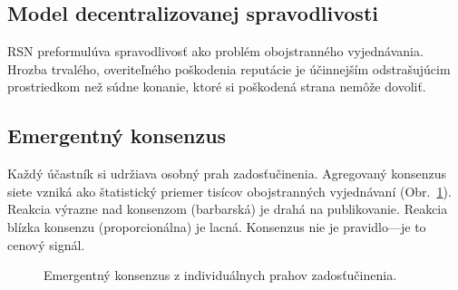 \documentclass[11pt,a4paper,twocolumn]{article}
\begin{document}
\subsection{Model decentralizovanej spravodlivosti}

RSN preformulúva spravodlivosť ako problém obojstranného vyjednávania. Hrozba trvalého, overiteľného poškodenia reputácie je účinnejším odstrašujúcim prostriedkom než súdne konanie, ktoré si poškodená strana nemôže dovoliť.

\subsection{Emergentný konsenzus}

Každý účastník si udržiava osobný prah zadosťučinenia. Agregovaný konsenzus siete vzniká ako štatistický priemer tisícov obojstranných vyjednávaní (Obr.~\ref{fig:consensus}). Reakcia výrazne nad konsenzom (barbarská) je drahá na publikovanie. Reakcia blízka konsenzu (proporcionálna) je lacná. Konsenzus nie je pravidlo---je to cenový signál.

\begin{figure}[ht]
\centering
{}
\caption{Emergentný konsenzus z individuálnych prahov zadosťučinenia.}
\label{fig:consensus}
\end{figure}
\end{document}
